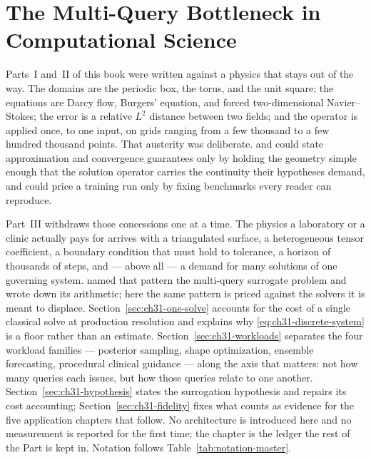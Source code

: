 
\chapter{The Multi-Query Bottleneck in Computational Science}
\label{ch:part3-the-multi-query-bottleneck-in-computationa}
\label{sec:intro_apps}

Parts~I and~II of this book were written against a physics that stays out of the way. The
domains are the periodic box, the torus, and the unit square; the equations are Darcy flow,
Burgers' equation, and forced two-dimensional Navier--Stokes; the error is a relative $L^{2}$
distance between two fields; and the operator is applied once, to one input, on grids ranging from a few thousand to a few hundred thousand points. That
austerity was deliberate.
 and
 could state approximation and
convergence guarantees only by holding the geometry simple enough that the solution operator
carries the continuity their hypotheses demand, and
 could price a training run only by
fixing benchmarks every reader can reproduce.

Part~III withdraws those concessions one at a time. The physics a laboratory or a clinic actually
pays for arrives with a triangulated surface, a heterogeneous tensor coefficient, a boundary
condition that must hold to tolerance, a horizon of thousands of steps, and --- above all --- a
demand for many solutions of one governing system.
 named that pattern the multi-query
surrogate problem and wrote down its arithmetic; here the same pattern is priced against the
solvers it is meant to displace. Section~\ref{sec:ch31-one-solve} accounts for the cost of a
single classical solve at production resolution and explains why \eqref{eq:ch31-discrete-system}
is a floor rather than an estimate. Section~\ref{sec:ch31-workloads} separates the four workload
families --- posterior sampling, shape optimization, ensemble forecasting, procedural clinical
guidance --- along the axis that matters: not how many queries each issues, but how those queries
relate to one another. Section~\ref{sec:ch31-hypothesis} states the surrogation hypothesis and
repairs its cost accounting; Section~\ref{sec:ch31-fidelity} fixes what counts as evidence for
the five application chapters that follow. No architecture is introduced here and no measurement
is reported for the first time; the chapter is the ledger the rest of the Part is kept
in. Notation follows
Table~\ref{tab:notation-master}.

